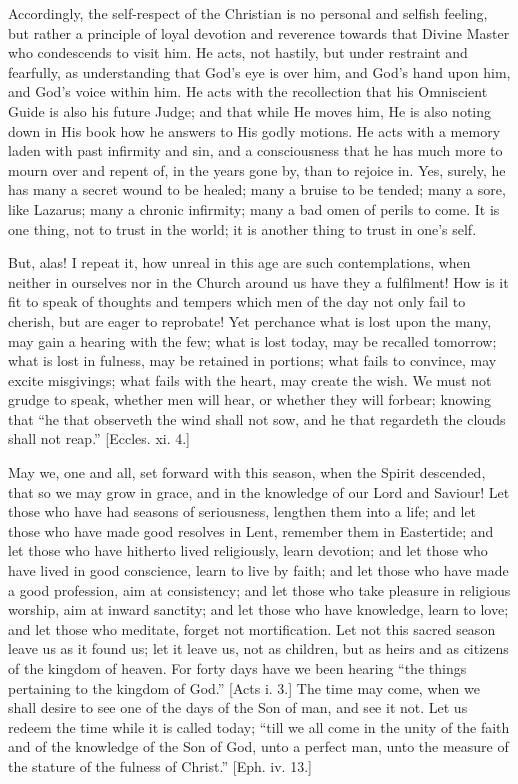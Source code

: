 Accordingly, the self-respect of the Christian is no personal and
selfish feeling, but rather a principle of loyal devotion and
reverence towards that Divine Master who condescends to visit him. He
acts, not hastily, but under restraint and fearfully, as understanding
that God's eye is over him, and God's hand upon him, and God's voice
within him. He acts with the recollection that his Omniscient Guide is
also his future Judge; and that while He moves him, He is also noting
down in His book how he answers to His godly motions. He acts with a
memory laden with past infirmity and sin, and a consciousness that he
has much more to mourn over and repent of, in the years gone by, than
to rejoice in. Yes, surely, he has many a secret wound to be healed;
many a bruise to be tended; many a sore, like Lazarus; many a chronic
infirmity; many a bad omen of perils to come. It is one thing, not to
trust in the world; it is another thing to trust in one's self.

But, alas! I repeat it, how unreal in this age are such
contemplations, when neither in ourselves nor in the Church around us
have they a fulfilment! How is it fit to speak of thoughts and tempers
which men of the day not only fail to cherish, but are eager to
reprobate! Yet perchance what is lost upon the many, may gain a
hearing with the few; what is lost today, may be recalled tomorrow;
what is lost in fulness, may be retained in portions; what fails to
convince, may excite misgivings; what fails with the heart, may create
the wish. We must not grudge to speak, whether men will hear, or
whether they will forbear; knowing that ``he that observeth the
wind shall not sow, and he that regardeth the clouds shall not
reap.'' [Eccles. xi. 4.]

May we, one and all, set forward with this season, when the Spirit
descended, that so we may grow in grace, and in the knowledge of our
Lord and Saviour! Let those who have had seasons of seriousness,
lengthen them into a life; and let those who have made good resolves
in Lent, remember them in Eastertide; and let those who have hitherto
lived religiously, learn devotion; and let those who have lived in
good conscience, learn to live by faith; and let those who have made a
good profession, aim at consistency; and let those who take pleasure
in religious worship, aim at inward sanctity; and let those who have
knowledge, learn to love; and let those who meditate, forget not
mortification. Let not this sacred season leave us as it found us; let
it leave us, not as children, but as heirs and as citizens of the
kingdom of heaven. For forty days have we been hearing ``the
things pertaining to the kingdom of God.'' [Acts i. 3.] The time
may come, when we shall desire to see one of the days of the Son of
man, and see it not. Let us redeem the time while it is called today;
``till we all come in the unity of the faith and of the knowledge
of the Son of God, unto a perfect man, unto the measure of the stature
of the fulness of Christ.'' [Eph. iv. 13.]

